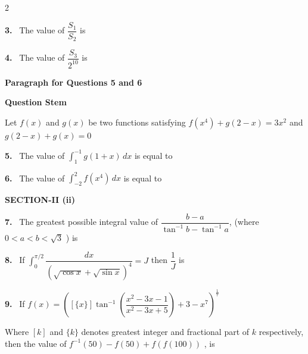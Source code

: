 \documentclass[10pt]{extarticle}
\newcommand{\sect}[1]{\par\smallskip\noindent\textbf{#1}\par}
\newcommand{\qn}[1]{\par\smallskip\noindent\textbf{#1.}~}
\newcommand{\paraq}[2]{\par\smallskip\noindent\textbf{Paragraph for Questions #1 and #2}\par}
\begin{document}
\begin{multicols}{2}
\qn{3} The value of $\dfrac{S_1}{S_2}$ is
\qn{4} The value of $\dfrac{S_3}{2^{10}}$ is
\paraq{5}{6}\textbf{Question Stem}\par
Let $f(x)$ and $g(x)$ be two functions satisfying $f(x^4)+g(2-x)=3x^2$ and $g(2-x)+g(x)=0$\par
\qn{5} The value of $\displaystyle\int_1^{-1}g(1+x)\,dx$ is equal to
\qn{6} The value of $\displaystyle\int_{-2}^2f(x^4)\,dx$ is equal to
\sect{SECTION-II (ii)}
\qn{7} The greatest possible integral value of $\dfrac{b-a}{\tan^{-1}b-\tan^{-1}a}$, (where $0<a<b<\sqrt3$ ) is
\qn{8} If $\displaystyle\int_0^{\pi/2}\dfrac{dx}{\left(\sqrt{\cos x}+\sqrt{\sin x}\right)^4}=J$ then $\dfrac1J$ is
\qn{9} If $f(x)=\left(\left[\{x\}\right]\tan^{-1}\left(\dfrac{x^2-3x-1}{x^2-3x+5}\right)+3-x^7\right)^{\frac17}$\par
Where $[k]$ and $\{k\}$ denotes greatest integer and fractional part of $k$ respectively, then the value of $f^{-1}(50)-f(50)+f(f(100))$ , is
\end{multicols}
\end{document}
